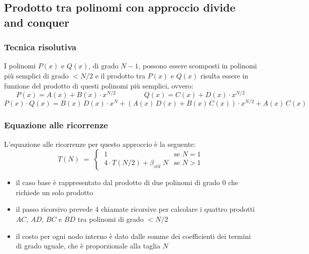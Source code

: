 \subsection{Prodotto tra polinomi con approccio divide and conquer}
\subsubsection*{Tecnica risolutiva}
I polinomi \(P(x)\) e \(Q(x)\), di grado \(N-1\), possono essere scomposti in polinomi più semplici di grado \(< N/2\)
e il prodotto tra \(P(x)\) e \(Q(x)\) risulta essere in funzione del prodotto di questi polinomi più semplici, ovvero:
\[P(x) = A(x) + B(x) \cdot x^{N/2} \qquad\qquad Q(x) = C(x) + D(x) \cdot x^{N/2}\]
\[P(x) \cdot Q(x) = B(x) \, D(x) \cdot x^N + (A(x) \, D(x) + B(x) \, C(x)) \cdot x^{N/2} + A(x) \, C(x)\]

\subsubsection*{Equazione alle ricorrenze}
L'equazione alle ricorrenze per questo approccio è la seguente:
\[T(N) \; = \; \begin{cases}
	\; 1 & \text{se } N = 1 \\[3pt]
	\; 4 \cdot T(N/2) + \beta_{std} \; N & \text{se } N > 1
\end{cases}\]
\begin{itemize}
	\item il caso base è rappresentato dal prodotto di due polinomi di grado 0 che richiede un solo prodotto
	\item il passo ricorsivo prevede 4 chiamate ricorsive per calcolare i quattro prodotti \(AC\), \(AD\), \(BC\) e \(BD\)
	tra polinomi di grado \(< N/2\)
	\item il costo per ogni nodo interno è dato dalle somme dei coefficienti dei termini di grado uguale, che è proporzionale
	alla taglia \(N\)
\end{itemize}

